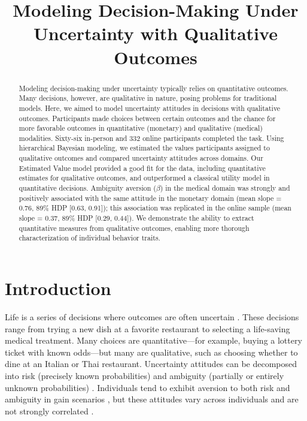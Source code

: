 \documentclass[11pt]{article}
\title{Modeling Decision-Making Under Uncertainty with Qualitative Outcomes}
\author{}
\date{}
\begin{document}
\maketitle

\begin{abstract}
Modeling decision-making under uncertainty typically relies on quantitative outcomes. Many decisions, however, are qualitative in nature, posing problems for traditional models. Here, we aimed to model uncertainty attitudes in decisions with qualitative outcomes. Participants made choices between certain outcomes and the chance for more favorable outcomes in quantitative (monetary) and qualitative (medical) modalities. Sixty-six in-person and 332 online participants completed the task. Using hierarchical Bayesian modeling, we estimated the values participants assigned to qualitative outcomes and compared uncertainty attitudes across domains. Our Estimated Value model provided a good fit for the data, including quantitative estimates for qualitative outcomes, and outperformed a classical utility model in quantitative decisions. Ambiguity aversion ($\beta$) in the medical domain was strongly and positively associated with the same attitude in the monetary domain (mean slope = 0.76, 89\% HDP [0.63, 0.91]); this association was replicated in the online sample (mean slope = 0.37, 89\% HDP [0.29, 0.44]). We demonstrate the ability to extract quantitative measures from qualitative outcomes, enabling more thorough characterization of individual behavior traits.
\end{abstract}

\section{Introduction}
Life is a series of decisions where outcomes are often uncertain \cite{kahneman1979prospect}. These decisions range from trying a new dish at a favorite restaurant to selecting a life-saving medical treatment. Many choices are quantitative---for example, buying a lottery ticket with known odds---but many are qualitative, such as choosing whether to dine at an Italian or Thai restaurant. Uncertainty attitudes can be decomposed into risk (precisely known probabilities) \cite{knight1921risk} and ambiguity (partially or entirely unknown probabilities) \cite{ellsberg1961risk}. Individuals tend to exhibit aversion to both risk and ambiguity in gain scenarios \cite{holt2002risk,levy2010neural,tymula2012adolescents,tymula2013aging}, but these attitudes vary across individuals and are not strongly correlated \cite{levy2010neural,tymula2013aging,xu2021ambiguity}.
\end{document}
